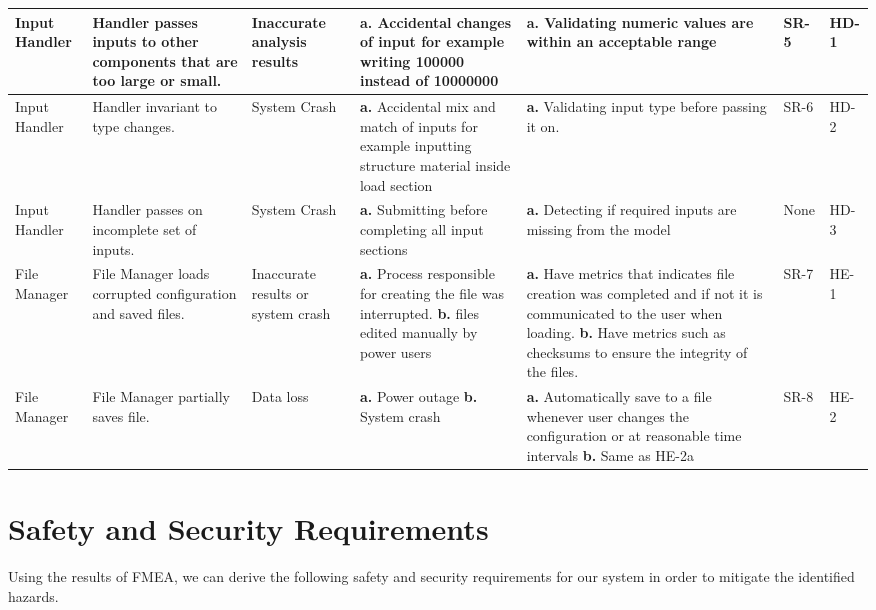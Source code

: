\documentclass{article}
\begin{document}
\begin{landscape}
\begin{table}[H]
\begin{tabular}{|p{} | p{} | p{} | p{} | p{} | p{} | p{}|}
        \midrule
        Input Handler& Handler passes inputs to other components that are too large or small.
        & Inaccurate analysis results
        & \textbf{a.} Accidental changes of input for example writing 100000 instead of 10000000      
        & \textbf{a.} Validating numeric values are within an acceptable range   
        &SR-5&HD-1\\
        \midrule
        Input Handler& Handler invariant to type changes.
        & System Crash
        & \textbf{a.} Accidental mix and match of inputs for example inputting structure material inside load section
        & \textbf{a.} Validating input type before passing it on.    
        &SR-6&HD-2\\
        \midrule
        Input Handler& Handler passes on incomplete set of inputs.
        & System Crash
        & \textbf{a.} Submitting before completing all input sections     
        & \textbf{a.} Detecting if required inputs are missing from the model   
        &None&HD-3\\
        \midrule
        File Manager& File Manager loads corrupted configuration and saved files.
        & Inaccurate results or system crash
        & \textbf{a.} Process responsible for creating the file was interrupted.\newline
          \textbf{b.} files edited manually by power users
        & \textbf{a.} Have metrics that indicates file creation was completed and if not it is communicated to the user when loading.\newline
          \textbf{b.} Have metrics such as checksums to ensure the integrity of the files.  
        &SR-7&HE-1\\
        \midrule
        File Manager& File Manager partially saves file.
        & Data loss
        & \textbf{a.} Power outage\newline
          \textbf{b.} System crash        
        & \textbf{a.} Automatically save to a file whenever user changes the configuration or at reasonable time intervals\newline
        \textbf{b.} Same as HE-2a  
        &SR-8&HE-2\\
        \bottomrule
          \end{tabular}
          \end{table}
\end{landscape}

\newpage

\section{Safety and Security Requirements}
Using the results of FMEA, we can derive the following safety and security requirements for our system in order to mitigate the identified hazards. \\
\end{document}
